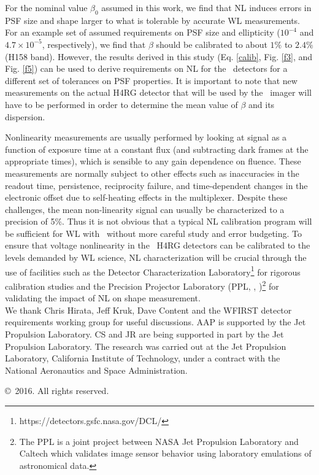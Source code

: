 \documentclass[11pt,preprint,flushrt]{aastex}
\begin{document}
For the nominal value $\beta_0$ assumed in this work, we find that NL induces errors in PSF size and shape larger to what is tolerable by accurate WL measurements. For an example set of assumed requirements on PSF size and ellipticity ($10^{-4}$  and $4.7\times 10^{-5}$, respectively), we find that  $\beta$ should be calibrated to about $1\%$ to $2.4\%$ (H158 band). However, the results derived in this study (Eq. \ref{calib}, Fig. \ref{f3}, and Fig. \ref{f5}) can be used to derive requirements on NL for the \wfa\ detectors for a different set of tolerances on PSF properties. It is important to note that new measurements on the actual H4RG detector that will be used by the \wf\ imager will have to be performed in order to determine the mean value of $\beta$ and its dispersion.

Nonlinearity measurements are usually performed by looking at signal as a function of exposure time at a constant flux (and subtracting dark frames at the appropriate times), which is sensible to any gain dependence on fluence. These measurements are normally subject to other effects such as inaccuracies in the readout time, persistence, reciprocity failure, and time-dependent changes in the electronic offset due to self-heating effects in the multiplexer. Despite these challenges, the mean non-linearity signal can usually be characterized to a precision of 5$\%$. Thus it is not obvious that a typical NL calibration program will be sufficient for WL with \wf\ without more careful study and error budgeting.
To ensure that voltage nonlinearity in the \wf\ H4RG detectors can be calibrated to the levels demanded by WL science, NL characterization will be crucial through the use of facilities such as the Detector Characterization Laboratory\footnote{https://detectors.gsfc.nasa.gov/DCL/} for rigorous calibration studies and the 
Precision Projector Laboratory (PPL, \citealt{seshadri13}, \citealt{shapiro13})\footnote{The PPL is a joint project between NASA Jet Propulsion Laboratory and Caltech which validates image sensor behavior using laboratory emulations of astronomical data.} for validating the impact of NL on shape measurement.\\

We thank Chris Hirata, Jeff Kruk, Dave Content and the WFIRST detector requirements working group for useful discussions. AAP is supported by the Jet Propulsion Laboratory. CS and JR are being supported in part by the Jet Propulsion Laboratory. The research was carried out at the Jet Propulsion Laboratory, California Institute of Technology, under a contract with the National Aeronautics and Space Administration.

\copyright\ 2016. All rights reserved.





\acknowledgments


\end{document}
